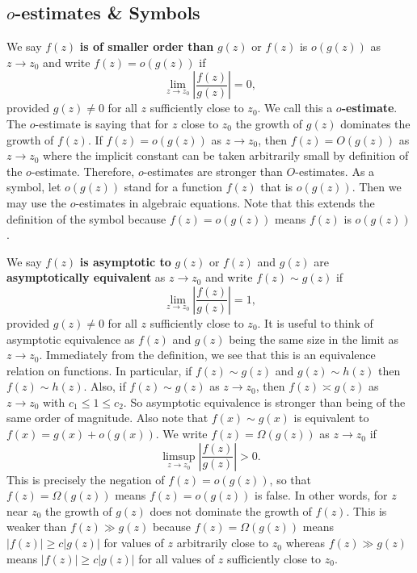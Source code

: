 \documentclass[12pt]{book}
\theoremstyle{definition}\newframedtheorem{method}{Method}
\newcommand{\W}{\Omega}
\newcommand{\<}{\langle}
\renewcommand{\>}{\rangle}
\begin{document}
    \subsection*{\texorpdfstring{$o$}{o}-estimates \& Symbols}
      We say $f(z)$ \textbf{is of smaller order than} $g(z)$ or $f(z)$ is $o(g(z))$ as $z \to z_{0}$ and write $f(z) = o(g(z))$ if
      \[
        \lim_{z \to z_{0}}\left|\frac{f(z)}{g(z)}\right| = 0,
      \]
      provided $g(z) \neq 0$ for all $z$ sufficiently close to $z_{0}$. We call this a \textbf{$o$-estimate}. The $o$-estimate is saying that for $z$ close to $z_{0}$ the growth of $g(z)$ dominates the growth of $f(z)$. If $f(z) = o(g(z))$ as $z \to z_{0}$, then $f(z) = O(g(z))$ as $z \to z_{0}$ where the implicit constant can be taken arbitrarily small by definition of the $o$-estimate. Therefore, $o$-estimates are stronger than $O$-estimates. As a symbol, let $o(g(z))$ stand for a function $f(z)$ that is $o(g(z))$. Then we may use the $o$-estimates in algebraic equations. Note that this extends the definition of the symbol because $f(z) = o(g(z))$ means $f(z)$ is $o(g(z))$.

      We say $f(z)$ \textbf{is asymptotic to} $g(z)$ or $f(z)$ and $g(z)$ are \textbf{asymptotically equivalent} as $z \to z_{0}$ and write $f(z) \sim g(z)$ if
      \[
        \lim_{z \to z_{0}}\left|\frac{f(z)}{g(z)}\right| = 1,
      \]
      provided $g(z) \neq 0$ for all $z$ sufficiently close to $z_{0}$. It is useful to think of asymptotic equivalence as $f(z)$ and $g(z)$ being the same size in the limit as $z \to z_{0}$. Immediately from the definition, we see that this is an equivalence relation on functions. In particular, if $f(z) \sim g(z)$ and $g(z) \sim h(z)$ then $f(z) \sim h(z)$. Also, if $f(z) \sim g(z)$ as $z \to z_{0}$, then $f(z) \asymp g(z)$ as $z \to z_{0}$ with $c_{1} \le 1 \le c_{2}$. So asymptotic equivalence is stronger than being of the same order of magnitude. Also note that $f(x) \sim g(x)$ is equivalent to $f(x) = g(x)+o(g(x))$. We write $f(z) = \W(g(z))$ as $z \to z_{0}$ if
      \[
        \limsup_{z \to z_{0}}\left|\frac{f(z)}{g(z)}\right| > 0.
      \]
      This is precisely the negation of $f(z) = o(g(z))$, so that $f(z) = \W(g(z))$ means $f(z) = o(g(z))$ is false. In other words, for $z$ near $z_{0}$ the growth of $g(z)$ does not dominate the growth of $f(z)$. This is weaker than $f(z) \gg g(z)$ because $f(z) = \W(g(z))$ means $|f(z)| \ge c|g(z)|$ for values of $z$ arbitrarily close to $z_{0}$ whereas $f(z) \gg g(z)$ means $|f(z)| \ge c|g(z)|$ for all values of $z$ sufficiently close to $z_{0}$.
\end{document}
